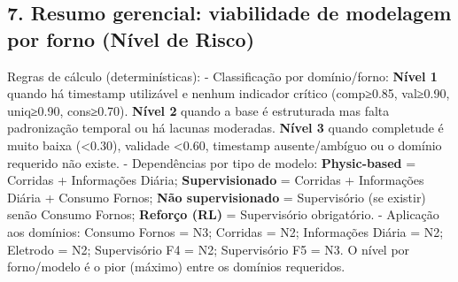\clearpage

\subsection{\texorpdfstring{\textbf{7. Resumo gerencial: viabilidade de
modelagem por forno (Nível de
Risco)}}{7. Resumo gerencial: viabilidade de modelagem por forno (Nível de Risco)}}\label{resumo-gerencial-viabilidade-de-modelagem-por-forno-nuxedvel-de-risco}

Regras de cálculo (determinísticas): - Classificação por domínio/forno:
\textbf{Nível 1} quando há timestamp utilizável e nenhum indicador
crítico (comp≥0.85, val≥0.90, uniq≥0.90, cons≥0.70). \textbf{Nível 2}
quando a base é estruturada mas falta padronização temporal ou há
lacunas moderadas. \textbf{Nível 3} quando completude é muito baixa
(\textless0.30), validade \textless0.60, timestamp ausente/ambíguo ou o
domínio requerido não existe. - Dependências por tipo de modelo:
\textbf{Physic-based} = Corridas + Informações Diária;
\textbf{Supervisionado} = Corridas + Informações Diária + Consumo
Fornos; \textbf{Não supervisionado} = Supervisório (se existir) senão
Consumo Fornos; \textbf{Reforço (RL)} = Supervisório obrigatório. -
Aplicação aos domínios: Consumo Fornos = N3; Corridas = N2; Informações
Diária = N2; Eletrodo = N2; Supervisório F4 = N2; Supervisório F5 = N3.
O nível por forno/modelo é o pior (máximo) entre os domínios requeridos.

